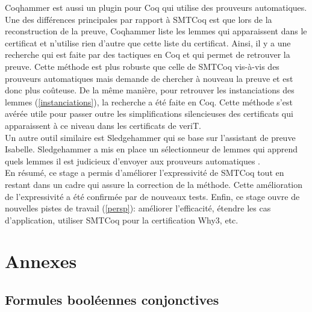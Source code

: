\documentclass[11pt]{article}
\begin{document}
Coqhammer \cite{coqhammer} est aussi un plugin pour Coq qui utilise des prouveurs automatiques. Une des différences principales par rapport à SMTCoq est que lors de la reconstruction de la preuve, Coqhammer liste les lemmes qui apparaissent dans le certificat et n'utilise rien d'autre que cette liste du certificat. Ainsi, il y a une recherche qui est faite par des tactiques en Coq et qui permet de retrouver la preuve. Cette méthode est plus robuste que celle  de SMTCoq vis-à-vis des prouveurs automatiques mais demande de chercher à nouveau la preuve et est donc plus coûteuse. De la même manière, pour retrouver les instanciations des lemmes (\ref{instanciations}), la recherche a été faite en Coq. Cette méthode s'est avérée utile pour passer outre les simplifications silencieuses des certificats qui apparaissent à ce niveau dans les certificats de veriT. \\
Un autre outil similaire est Sledgehammer \cite{sledgehammer_manual} qui se base sur l'assistant de preuve Isabelle. Sledgehammer a mis en place un sélectionneur de lemmes qui apprend quels lemmes il est judicieux d'envoyer aux prouveurs automatiques \cite{hol_selector}.\\

En résumé, ce stage a permis d'améliorer l'expressivité de SMTCoq tout en restant dans un cadre qui assure la correction de la méthode. Cette amélioration de l'expressivité a été confirmée par de nouveaux tests. Enfin, ce stage ouvre de nouvelles pistes de travail (\ref{persp}): améliorer l'efficacité, étendre les cas d'application, utiliser SMTCoq pour la certification Why3, etc.



\renewcommand\refname{Bibliographie}
\nocite{*}
{}


\newpage
\pagestyle{empty}

\section{Annexes}
\subsection{Formules booléennes conjonctives} \label{annexe_peigne}
\end{document}

